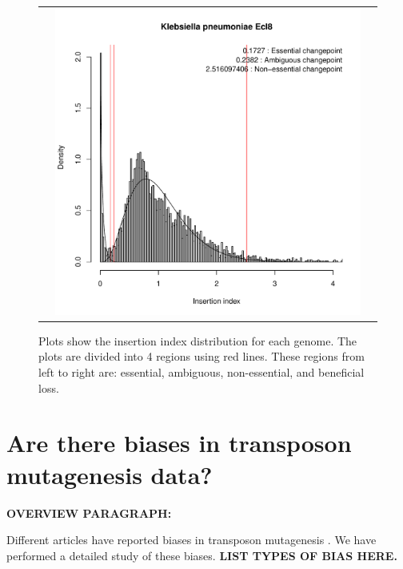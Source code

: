 \documentclass[12pt,letterpaper]{article}
\begin{document}
\begin{figure}
\begin{tabular}{c c c}
&\includegraphics[page=13, scale=0.25]{essentiality.pdf}&\\
\end{tabular}
\caption{Plots show the insertion index distribution for each genome. The plots are divided into 4 regions using red lines. These regions from left to right are: essential, ambiguous, non-essential, and beneficial loss.}
\label{fig:iidist-species}
\end{figure}

\section{Are there biases in transposon mutagenesis data?}

{\bf OVERVIEW PARAGRAPH:} 

Different articles have reported biases in transposon mutagenesis \cite{barquist_comparison_2013, rubin_essential_2015, kimura_nucleoid_2016}. We have performed a detailed study of these biases. {\bf LIST TYPES OF BIAS HERE.} 
\end{document}
